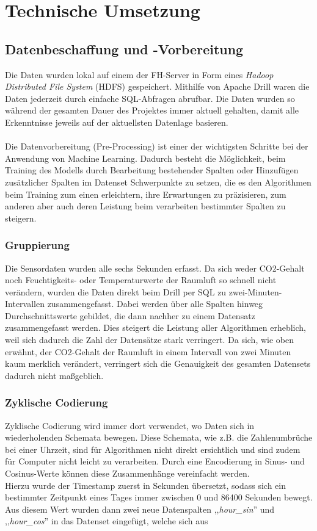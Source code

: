 \newpage
\chapter{Technische Umsetzung}

\section{Datenbeschaffung und -Vorbereitung}
Die Daten wurden lokal auf einem der FH-Server in Form eines \textit{Hadoop Distributed File System} (HDFS) 
gespeichert. Mithilfe von Apache Drill waren die Daten jederzeit durch einfache SQL-Abfragen abrufbar. 
Die Daten wurden so während der gesamten Dauer des Projektes immer aktuell gehalten, damit alle Erkenntnisse 
jeweils auf der aktuellsten Datenlage basieren.
\\\\
Die Datenvorbereitung (Pre-Processing) ist einer der wichtigsten Schritte bei der Anwendung von Machine 
Learning. Dadurch besteht die Möglichkeit, beim Training des Modells durch Bearbeitung bestehender Spalten
oder Hinzufügen zusätzlicher Spalten im Datenset Schwerpunkte zu setzen, die es den Algorithmen beim Training
zum einen erleichtern, ihre Erwartungen zu präzisieren, zum anderen aber auch deren Leistung beim verarbeiten
bestimmter Spalten zu steigern.
\subsection{Gruppierung}
Die Sensordaten wurden alle sechs Sekunden erfasst. Da sich weder CO2-Gehalt noch Feuchtigkeits- oder 
Temperaturwerte der Raumluft so schnell nicht verändern, wurden die Daten direkt beim Drill per SQL zu 
zwei-Minuten-Intervallen zusammengefasst. Dabei werden über alle Spalten hinweg Durchschnittswerte gebildet, 
die dann nachher zu einem Datensatz zusammengefasst werden. 
Dies steigert die Leistung aller Algorithmen erheblich, weil sich dadurch die Zahl der 
Datensätze stark verringert. Da sich, wie oben erwähnt, der CO2-Gehalt der Raumluft in einem 
Intervall von zwei Minuten kaum merklich verändert, verringert sich die Genauigkeit des gesamten Datensets
dadurch nicht maßgeblich.
\subsection{Zyklische Codierung}
Zyklische Codierung wird immer dort verwendet, wo Daten sich in wiederholenden Schemata bewegen. Diese 
Schemata, wie z.B. die Zahlenumbrüche bei einer Uhrzeit, sind für Algorithmen nicht direkt ersichtlich und 
sind zudem für Computer nicht leicht zu verarbeiten. Durch eine Encodierung in 
Sinus- und Cosinus-Werte können diese Zusammenhänge vereinfacht werden.\\
Hierzu wurde der Timestamp zuerst in Sekunden übersetzt, sodass sich ein bestimmter Zeitpunkt eines Tages 
immer zwischen 0 und 86400 Sekunden bewegt.
Aus diesem Wert wurden dann zwei neue Datenspalten ,,\textit{hour\_sin}'' und ,,\textit{hour\_cos}'' 
in das Datenset eingefügt, welche sich aus 

